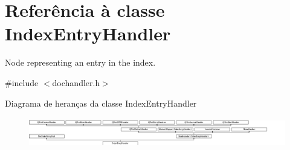 \hypertarget{class_index_entry_handler}{\section{Referência à classe Index\-Entry\-Handler}
\label{class_index_entry_handler}
}


Node representing an entry in the index.  




{\ttfamily \#include $<$dochandler.\-h$>$}

Diagrama de heranças da classe Index\-Entry\-Handler\begin{figure}[H]
\begin{center}
\leavevmode
\includegraphics[height=1.350211cm]{class_index_entry_handler}
\end{center}
\end{figure}
